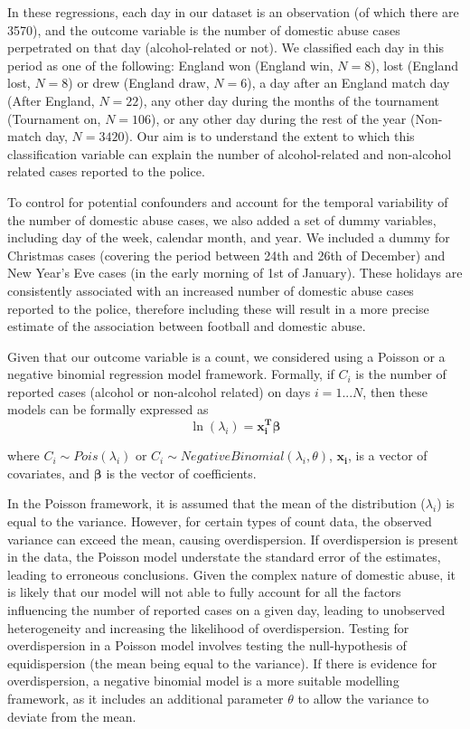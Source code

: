 \documentclass[12pt, a4paper]{article}
\newcommand{\vect}[1]{\boldsymbol{#1}}
\begin{document}
In these regressions, each day in our dataset is an observation (of which there are 3570), and the outcome variable is the number of domestic abuse cases perpetrated on that day (alcohol-related or not). We classified each day in this period as one of the following: England won (England win, $N = 8$), lost (England lost, $N = 8$) or drew (England draw, $N = 6$), a day after an England match day (After England, $N = 22$), any other day during the months of the tournament (Tournament on, $N = 106$), or any other day during the rest of the year (Non-match day, $N = 3420$). Our aim is to understand the extent to which this classification variable can explain the number of alcohol-related and non-alcohol related cases reported to the police.

To control for potential confounders and account for the temporal variability of the number of domestic abuse cases, we also added a set of dummy  variables, including day of the week, calendar month, and year. 
We included a dummy for Christmas cases (covering the period between 24th and 26th of December) and New Year's Eve cases (in the early morning of 1st of January). 
These holidays are consistently associated with an increased number of domestic abuse cases reported to the police, therefore including these will result in a more precise estimate of the association between football and domestic abuse.

Given that our outcome variable is a count, we considered using a Poisson or a negative binomial regression model framework. 
Formally, if $C_i$ is the number of reported cases (alcohol or non-alcohol related) on days $i = 1...N$, then these models can be formally expressed as
%
\begin{equation}
 \ln(\lambda_i) =\vect{x_i^{T}}\vect{\beta}
\end{equation}


where 
$C_i \sim Pois(\lambda_i)$ or $C_i \sim Negative Binomial(\lambda_i,\theta)$, $\vect{x_i}$, is a vector of covariates, and $\boldsymbol{\beta}$ is the vector of coefficients.

In the Poisson framework, it is assumed that the mean of the distribution ($\lambda_i$) is equal to the variance. 
However, for certain types of count data, the observed variance can exceed the mean, causing overdispersion. 
If overdispersion is present in the data, the Poisson model understate the standard error of the estimates, leading to erroneous conclusions. 
Given the complex nature of domestic abuse, it is likely that our model will not able to fully account for all the factors influencing the number of reported cases on a given day, leading to unobserved heterogeneity and increasing the likelihood of overdispersion. 
Testing for overdispersion in a Poisson model involves testing the null-hypothesis of equidispersion (the mean being equal to the variance).
If there is evidence for overdispersion, a negative binomial model is a more suitable modelling framework, as it includes an additional parameter $\theta$ to allow the variance to deviate from the mean. 
\end{document}

